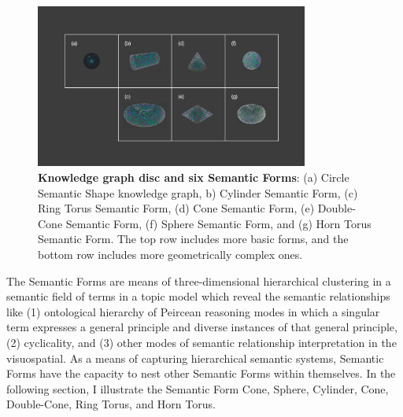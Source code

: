 \begin{figure}[p] %
    \centering
    \includegraphics[width=0.8\textwidth]{figures/5.4.png}
       \caption[Knowledge graph disc and six Semantic Forms]{\textbf{Knowledge graph disc and six Semantic Forms}: (a) Circle Semantic Shape knowledge graph, b) Cylinder Semantic Form, (c) Ring Torus Semantic Form, (d) Cone Semantic Form, (e) Double-Cone Semantic Form, (f) Sphere Semantic Form, and (g) Horn Torus Semantic Form. The top row includes more basic forms, and the bottom row includes more geometrically complex ones.}
    \label{f5.4}
\end{figure}
\FloatBarrier
\par





The Semantic Forms are means of three-dimensional hierarchical clustering in a semantic field of terms in a topic model which reveal the semantic relationships like (1) ontological hierarchy of Peircean reasoning modes in which a singular term expresses a general principle and diverse instances of that general principle, (2) cyclicality, and (3) other modes of semantic relationship interpretation in the visuospatial. As a means of capturing hierarchical semantic systems, Semantic Forms have the capacity to nest other Semantic Forms within themselves. In the following section, I illustrate the Semantic Form Cone, Sphere, Cylinder, Cone, Double-Cone, Ring Torus, and Horn Torus.


